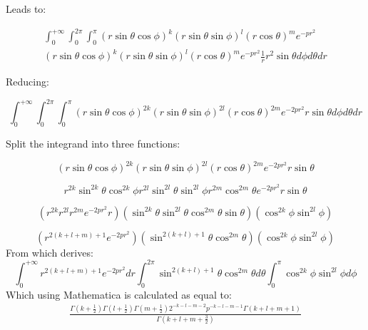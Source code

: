 \noindent Leads to:

\begin{multline}
	\int_{0}^{+\infty} \int_{0}^{2\pi} \int_{0}^{\pi} 
	(r \sin{\theta} \cos{\phi})^k
	(r \sin{\theta} \sin{\phi})^l
	(r \cos{\theta})^m 
	e^{-p r^2}
	\\
	(r \sin{\theta} \cos{\phi})^k
	(r \sin{\theta} \sin{\phi})^l
	(r \cos{\theta})^m
	e^{-p r^2} 
	\frac{1}{r}
	r^2 \sin{\theta}
	d\phi d\theta d r
\end{multline}

\noindent Reducing:

\begin{equation}
	\int_{0}^{+\infty} \int_{0}^{2\pi} \int_{0}^{\pi} 
	(r \sin{\theta} \cos{\phi})^{2k}
	(r \sin{\theta} \sin{\phi})^{2l}
	(r \cos{\theta})^{2m}
	e^{-2p r^2} 
	r \sin{\theta}
	d\phi d\theta d r
\end{equation}

\noindent Split the integrand into three functions:

\begin{equation}
	(r \sin{\theta} \cos{\phi})^{2k}
	(r \sin{\theta} \sin{\phi})^{2l}
	(r \cos{\theta})^{2m}
	e^{-2p r^2} 
	r \sin{\theta}
\end{equation}

\begin{equation}
	r^{2k} \sin^{2k}{\theta} \cos^{2k}{\phi} 
	r^{2l} \sin^{2l}{\theta}  \sin^{2l}{\phi} 
	r^{2m} \cos^{2m}{\theta} 
	e^{-2p r^2} 
	r \sin{\theta}
\end{equation}

\begin{equation}
	(r^{2k} r^{2l} r^{2m} e^{-2p r^2} r)
	(\sin^{2k}{\theta}\sin^{2l}{\theta} \cos^{2m}{\theta}  \sin{\theta} )
	(\cos^{2k}{\phi}   \sin^{2l}{\phi} )
\end{equation}

\begin{equation}
	(r^{2(k+l+m)+1} e^{-2p r^2})
	(\sin^{2(k+l)+1}{\theta}\cos^{2m}{\theta})
	(\cos^{2k}{\phi}   \sin^{2l}{\phi} )
\end{equation}
From which derives:
\begin{equation}
	\int_{0}^{+\infty} r^{2(k+l+m)+1} e^{-2p r^2} d r
	\int_{0}^{2\pi} \sin^{2(k+l)+1}{\theta}\cos^{2m}{\theta} d\theta
	\int_{0}^{\pi} \cos^{2k}{\phi}   \sin^{2l}{\phi} d\phi
\end{equation}
Which using Mathematica is calculated as equal to:
\begin{multline}
	\frac{\Gamma \left(k+\frac{1}{2}\right) \Gamma \left(l+\frac{1}{2}\right) \Gamma \left(m+\frac{1}{2}\right) 2^{-k-l-m-2} p^{-k-l-m-1} \Gamma (k+l+m+1)}{\Gamma\left(k+l+m+\frac{3}{2}\right)} \\
\end{multline}

